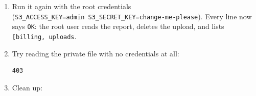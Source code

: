 \begin{enumerate}
\begin{codeblock}
\begin{Shaded}
\begin{Highlighting}[]
\OperatorTok{=}\OperatorTok{=}
\end{Highlighting}
\end{Shaded}

  \end{codeblock}

  \begin{codeblock}
  \begin{Verbatim}[formatcom=\outputstyle]
  OK      upload uploads/hello.txt
  OK      read uploads/hello.txt hi!
  DENIED  read billing/report.csv: AccessDenied
  DENIED  delete uploads/hello.txt: AccessDenied
  DENIED  list all buckets: AccessDenied
  \end{Verbatim}
  \end{codeblock}
\item
  Run it again with the root credentials (\texttt{S3\_}\allowbreak{}\texttt{ACCESS\_}\allowbreak{}\texttt{KEY=}\allowbreak{}\texttt{admin\ S3\_}\allowbreak{}\texttt{SECRET\_}\allowbreak{}\texttt{KEY=}\allowbreak{}\texttt{change-}\allowbreak{}\texttt{me-}\allowbreak{}\texttt{please}). Every line now says \texttt{OK}: the root user reads the report, deletes the upload, and lists \texttt{{[}\textquotesingle{}billing\textquotesingle{},}\allowbreak{}\texttt{\ \textquotesingle{}uploads\textquotesingle{}{]}}.
\item
  Try reading the private file with no credentials at all:

  \begin{codeblock}

\begin{Shaded}
\begin{Highlighting}[]
   
\end{Highlighting}
\end{Shaded}

  \end{codeblock}

  \begin{codeblock}
  \begin{Verbatim}[formatcom=\outputstyle]
  403
  \end{Verbatim}
  \end{codeblock}
\item
  Clean up:


\end{enumerate}
